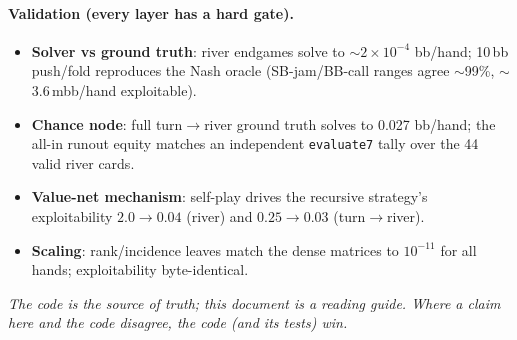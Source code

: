 \documentclass[11pt,a4paper]{article}
\begin{document}
\paragraph{Validation (every layer has a hard gate).}
\begin{itemize}[leftmargin=1.4em, itemsep=0pt]
\item \textbf{Solver vs ground truth}: river endgames solve to $\sim\!2\times10^{-4}$
  bb/hand; 10\,bb push/fold reproduces the Nash oracle (SB-jam/BB-call ranges
  agree $\sim$99\%, $\sim$3.6\,mbb/hand exploitable).
\item \textbf{Chance node}: full turn$\to$river ground truth solves to 0.027
  bb/hand; the all-in runout equity matches an independent \texttt{evaluate7}
  tally over the 44 valid river cards.
\item \textbf{Value-net mechanism}: self-play drives the recursive strategy's
  exploitability $2.0\to0.04$ (river) and $0.25\to0.03$ (turn$\to$river).
\item \textbf{Scaling}: rank/incidence leaves match the dense matrices to
  $10^{-11}$ for all hands; exploitability byte-identical.
\end{itemize}

\vfill
\begin{center}\small\itshape
The code is the source of truth; this document is a reading guide. Where a claim
here and the code disagree, the code (and its tests) win.
\end{center}
\end{document}
